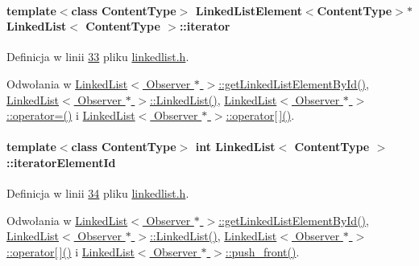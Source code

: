 \hypertarget{class_linked_list_a6f117a991b3e2e020f43807500b45f5f}{
\paragraph[{iterator}]{\setlength{\rightskip}{0pt plus 5cm}template$<$class Content\-Type$>$ {\bf Linked\-List\-Element}$<$Content\-Type$>$$\ast$ {\bf Linked\-List}$<$ Content\-Type $>$\-::iterator}}\label{class_linked_list_a6f117a991b3e2e020f43807500b45f5f}


Definicja w linii \hyperlink{linkedlist_8h_source_l00033}{33} pliku \hyperlink{linkedlist_8h_source}{linkedlist.\-h}.



Odwołania w \hyperlink{linkedlist_8h_source_l00197}{Linked\-List$<$ Observer $\ast$ $>$\-::get\-Linked\-List\-Element\-By\-Id()}, \hyperlink{linkedlist_8h_source_l00038}{Linked\-List$<$ Observer $\ast$ $>$\-::\-Linked\-List()}, \hyperlink{linkedlist_8h_source_l00262}{Linked\-List$<$ Observer $\ast$ $>$\-::operator=()} i \hyperlink{linkedlist_8h_source_l00159}{Linked\-List$<$ Observer $\ast$ $>$\-::operator\mbox{[}$\,$\mbox{]}()}.

\hypertarget{class_linked_list_a6398cec56a986426925e4e651bc4725c}{
\paragraph[{iterator\-Element\-Id}]{\setlength{\rightskip}{0pt plus 5cm}template$<$class Content\-Type$>$ int {\bf Linked\-List}$<$ Content\-Type $>$\-::iterator\-Element\-Id}}\label{class_linked_list_a6398cec56a986426925e4e651bc4725c}


Definicja w linii \hyperlink{linkedlist_8h_source_l00034}{34} pliku \hyperlink{linkedlist_8h_source}{linkedlist.\-h}.



Odwołania w \hyperlink{linkedlist_8h_source_l00197}{Linked\-List$<$ Observer $\ast$ $>$\-::get\-Linked\-List\-Element\-By\-Id()}, \hyperlink{linkedlist_8h_source_l00038}{Linked\-List$<$ Observer $\ast$ $>$\-::\-Linked\-List()}, \hyperlink{linkedlist_8h_source_l00159}{Linked\-List$<$ Observer $\ast$ $>$\-::operator\mbox{[}$\,$\mbox{]}()} i \hyperlink{linkedlist_8h_source_l00113}{Linked\-List$<$ Observer $\ast$ $>$\-::push\-\_\-front()}.

